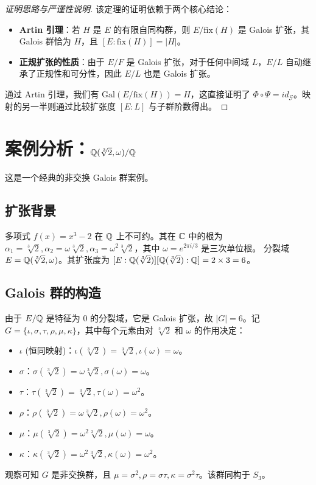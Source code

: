 \documentclass[11pt]{article}
\begin{document}
\begin{proof}[证明思路与严谨性说明]
    该定理的证明依赖于两个核心结论：
    \begin{itemize}
        \item \textbf{Artin 引理}：若 $H$ 是 $E$ 的有限自同构群，则 $E/\text{fix}(H)$ 是 Galois 扩张，其 Galois 群恰为 $H$，且 $[E:\text{fix}(H)] = |H|$。
        \item \textbf{正规扩张的性质}：由于 $E/F$ 是 Galois 扩张，对于任何中间域 $L$，$E/L$ 自动继承了正规性和可分性，因此 $E/L$ 也是 Galois 扩张。
    \end{itemize}
    通过 Artin 引理，我们有 $\text{Gal}(E/\text{fix}(H)) = H$，这直接证明了 $\Phi \circ \Psi = id_{\mathcal{G}}$。映射的另一半则通过比较扩张度 $[E:L]$ 与子群阶数得出。
\end{proof}

\section{案例分析：$\mathbb{Q}(\sqrt[3]{2}, \omega)/\mathbb{Q}$}

这是一个经典的非交换 Galois 群案例。

\subsection{扩张背景}
多项式 $f(x) = x^3 - 2$ 在 $\mathbb{Q}$ 上不可约。其在 $\mathbb{C}$ 中的根为 $\alpha_1 = \sqrt[3]{2}, \alpha_2 = \omega \sqrt[3]{2}, \alpha_3 = \omega^2 \sqrt[3]{2}$，其中 $\omega = e^{2\pi i / 3}$ 是三次单位根。
分裂域 $E = \mathbb{Q}(\sqrt[3]{2}, \omega)$。其扩张度为 $[E : \mathbb{Q}(\sqrt[3]{2})] [\mathbb{Q}(\sqrt[3]{2}) : \mathbb{Q}] = 2 \times 3 = 6$。

\subsection{Galois 群的构造}
由于 $E/\mathbb{Q}$ 是特征为 0 的分裂域，它是 Galois 扩张，故 $|G| = 6$。记 $G = \{ \iota, \sigma, \tau, \rho, \mu, \kappa \}$，其中每个元素由对 $\sqrt[3]{2}$ 和 $\omega$ 的作用决定：
\begin{itemize}
    \item $\iota$ (恒同映射)：$\iota(\sqrt[3]{2}) = \sqrt[3]{2}, \iota(\omega) = \omega$。
    \item $\sigma$：$\sigma(\sqrt[3]{2}) = \omega \sqrt[3]{2}, \sigma(\omega) = \omega$。
    \item $\tau$：$\tau(\sqrt[3]{2}) = \sqrt[3]{2}, \tau(\omega) = \omega^2$。
    \item $\rho$：$\rho(\sqrt[3]{2}) = \omega \sqrt[3]{2}, \rho(\omega) = \omega^2$。
    \item $\mu$：$\mu(\sqrt[3]{2}) = \omega^2 \sqrt[3]{2}, \mu(\omega) = \omega$。
    \item $\kappa$：$\kappa(\sqrt[3]{2}) = \omega^2 \sqrt[3]{2}, \kappa(\omega) = \omega^2$。
\end{itemize}
观察可知 $G$ 是非交换群，且 $\mu = \sigma^2, \rho = \sigma\tau, \kappa = \sigma^2\tau$。该群同构于 $S_3$。
\end{document}
